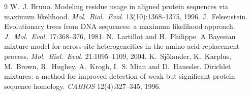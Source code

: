 \documentclass[11pt]{article}
\begin{document}
\begin{thebibliography}{9}
W.~J. Bruno. Modeling residue usage in aligned protein sequences via maximum
likelihood. \emph{Mol.\ Biol.\ Evol.} 13(10):1368--1375, 1996.
J.~Felsenstein. Evolutionary trees from {DNA} sequences: a maximum likelihood
approach. \emph{J.\ Mol.\ Evol.} 17:368--376, 1981.
N.~Lartillot and H.~Philippe. A Bayesian mixture model for across-site
heterogeneities in the amino-acid replacement process. \emph{Mol.\ Biol.\
Evol.} 21:1095--1109, 2004.
K.~Sj{\"o}lander, K.~Karplus, M.~Brown, R.~Hughey, A.~Krogh, I.~S. Mian and
D.~Haussler. Dirichlet mixtures: a method for improved detection of weak but
significant protein sequence homology. \emph{CABIOS} 12(4):327--345, 1996.
\end{thebibliography}
\end{document}
